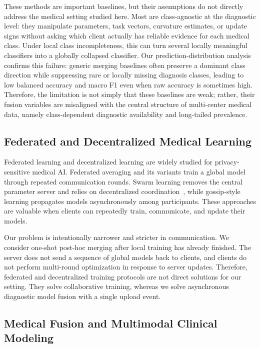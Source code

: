 These methods are important baselines, but their assumptions do not directly address the medical setting studied here. Most are class-agnostic at the diagnostic level: they manipulate parameters, task vectors, curvature estimates, or update signs without asking which client actually has reliable evidence for each medical class. Under local class incompleteness, this can turn several locally meaningful classifiers into a globally collapsed classifier. Our prediction-distribution analysis confirms this failure: generic merging baselines often preserve a dominant class direction while suppressing rare or locally missing diagnosis classes, leading to low balanced accuracy and macro F1 even when raw accuracy is sometimes high. Therefore, the limitation is not simply that these baselines are weak; rather, their fusion variables are misaligned with the central structure of multi-center medical data, namely class-dependent diagnostic availability and long-tailed prevalence.

\subsection{Federated and Decentralized Medical Learning}

Federated learning and decentralized learning are widely studied for privacy-sensitive medical AI. Federated averaging and its variants train a global model through repeated communication rounds. Swarm learning removes the central parameter server and relies on decentralized coordination~\cite{warnat2021swarm}, while gossip-style learning propagates models asynchronously among participants. These approaches are valuable when clients can repeatedly train, communicate, and update their models.

Our problem is intentionally narrower and stricter in communication. We consider one-shot post-hoc merging after local training has already finished. The server does not send a sequence of global models back to clients, and clients do not perform multi-round optimization in response to server updates. Therefore, federated and decentralized training protocols are not direct solutions for our setting. They solve collaborative training, whereas we solve asynchronous diagnostic model fusion with a single upload event.

\subsection{Medical Fusion and Multimodal Clinical Modeling}

